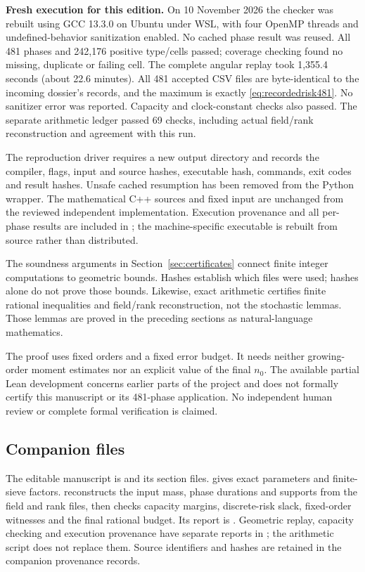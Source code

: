 \noindent\textbf{Fresh execution for this edition.}
On 10 November 2026 the checker was rebuilt using GCC 13.3.0 on
Ubuntu under WSL, with four OpenMP threads and undefined-behavior
sanitization enabled. No cached phase result was reused.
All 481 phases and 242,176 positive type/cells passed; coverage checking
found no missing, duplicate or failing cell. The complete angular
replay took 1,355.4 seconds (about 22.6 minutes).
All 481 accepted CSV files are byte-identical to the incoming dossier's
records, and the maximum is exactly \eqref{eq:recordedrisk481}.
No sanitizer error was reported. Capacity and clock-constant checks
also passed. The separate arithmetic ledger passed 69 checks,
including actual field/rank reconstruction and agreement with this run.

The reproduction driver  requires a new
output directory and records the compiler, flags, input and source hashes,
executable hash, commands, exit codes and result hashes. Unsafe cached
resumption has been removed from the Python wrapper. The mathematical
C++ sources and fixed input are unchanged from the reviewed independent
implementation. Execution provenance and all per-phase results are
included in ; the machine-specific executable
is rebuilt from source rather than distributed.

The soundness arguments in Section~\ref{sec:certificates} connect finite
integer computations to geometric bounds. Hashes establish which files
were used; hashes alone do not prove those bounds. Likewise, exact
arithmetic certifies finite rational inequalities and field/rank
reconstruction, not the stochastic lemmas. Those lemmas are proved
in the preceding sections as natural-language mathematics.

The proof uses fixed orders and a fixed error budget. It needs neither
growing-order moment estimates nor an explicit value of the final \(n_0\).
The available partial Lean development concerns earlier parts of the
project and does not formally certify this manuscript or its 481-phase
application. No independent human review or complete formal verification
is claimed.

\subsection{Companion files}
The editable manuscript is  and its section files.
 gives exact parameters and finite-sieve factors.
 reconstructs the input mass, phase
durations and supports from the field and rank files, then checks
capacity margins, discrete-risk slack, fixed-order witnesses and the
final rational budget. Its report is .
Geometric replay, capacity checking and execution provenance have
separate reports in ; the arithmetic
script does not replace them. Source identifiers and hashes are
retained in the companion provenance records.


